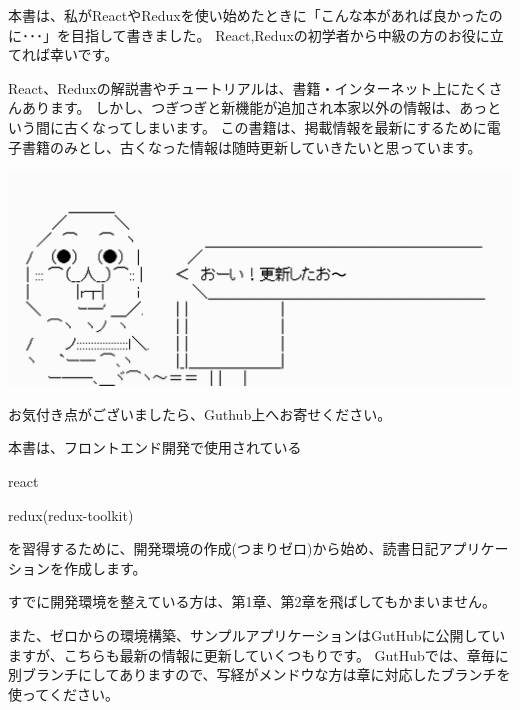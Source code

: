 本書は、私がReactやReduxを使い始めたときに「こんな本があれば良かったのに･･･」を目指して書きました。
React,Reduxの初学者から中級の方のお役に立てれば幸いです。

\vspace*{\baselineskip}

React、Reduxの解説書やチュートリアルは、書籍・インターネット上にたくさんあります。
しかし、つぎつぎと新機能が追加され本家以外の情報は、あっという間に古くなってしまいます。
この書籍は、掲載情報を最新にするために電子書籍のみとし、古くなった情報は随時更新していきたいと思っています。

\begin{reviewimage}[H]%
\includegraphics[width=0.7\maxwidth]{./images/00-preface/greetings03.png}%
\label{image:00-preface:greetings03}
\end{reviewimage}

お気付き点がございましたら、Guthub上へお寄せください。

\vspace*{\baselineskip}

本書は、フロントエンド開発で使用されている

\begin{starteritemize}
\item react
\item redux(redux{-}toolkit)
\end{starteritemize}

を習得するために、開発環境の作成(つまりゼロ)から始め、読書日記アプリケーションを作成します。

\vspace*{\baselineskip}

すでに開発環境を整えている方は、第1章、第2章を飛ばしてもかまいません。

\vspace*{\baselineskip}

また、ゼロからの環境構築、サンプルアプリケーションはGutHubに公開していますが、こちらも最新の情報に更新していくつもりです。
GutHubでは、章毎に別ブランチにしてありますので、写経がメンドウな方は章に対応したブランチを使ってください。


